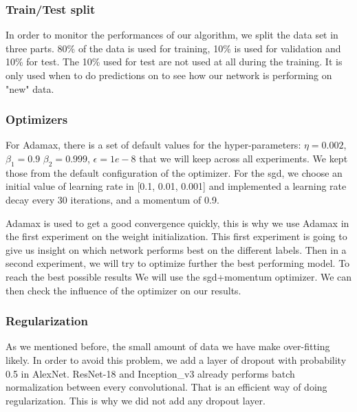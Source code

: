 \subsubsection{Train/Test split}
In order to monitor the performances of our algorithm, we split the data set in three parts. 80\% of the data is used for training, 10\% is used for validation and 10\% for test. The 10\% used for test are not used at all during the training. It is only used when to do predictions on to see how our network is performing on "new" data. 

\subsubsection{Optimizers}
For Adamax, there is a set of default values for the hyper-parameters: \(\eta = 0.002\), \(\beta_1 = 0.9\) \(\beta_2 = 0.999\), \(\epsilon = 1e-8\) that we will keep across all experiments. We kept those from the default configuration of the optimizer. 
For the \gls{sgd}, we choose an initial value of learning rate in [0.1, 0.01, 0.001] and implemented a learning rate decay every 30 iterations, and a momentum of 0.9. 

Adamax is used to get a good convergence quickly, this is why we use Adamax in the first experiment on the weight initialization. This first experiment is going to give us insight on which network performs best on the different labels. Then in a second experiment, we will try to optimize further the best performing model. To reach the best possible results We will use the \gls{sgd}+momentum optimizer. We can then check the influence of the optimizer on our results. 

\subsubsection{Regularization}
As we mentioned before, the small amount of data we have make over-fitting likely. In order to avoid this problem, we add a layer of dropout with probability 0.5 in AlexNet. ResNet-18 and Inception\_v3 already performs batch normalization between every convolutional. That is an efficient way of doing regularization. This is why we did not add any dropout layer.  